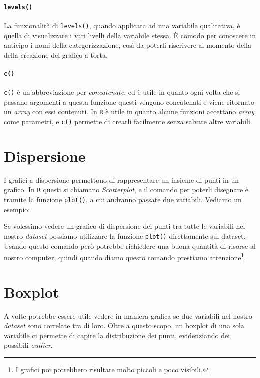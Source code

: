 \paragraph*{\texttt{levels()}} La funzionalità di \texttt{levels()}, quando
applicata ad una variabile qualitativa, è quella di visualizzare i vari livelli
della variabile stessa. È comodo per conoscere in anticipo i nomi della
categorizzazione, così da poterli riscrivere al momento della della creazione
del grafico a torta.

\paragraph*{\texttt{c()}} \texttt{c()} è un'abbreviazione per
\textit{concatenate}, ed è utile in quanto ogni volta che si passano argomenti
a questa funzione questi vengono concatenati e viene ritornato un
\textit{array} con essi contenuti. In \texttt{R} è utile in quanto alcune
funzioni accettano \textit{array} come parametri, e \texttt{c()} permette di
crearli facilmente senza salvare altre variabili.

\section{Dispersione}

I grafici a dispersione permettono di rappresentare un insieme di punti in un
grafico. In \texttt{R} questi si chiamano \textit{Scatterplot}, e il comando
per poterli disegnare è tramite la funzione \texttt{plot()}, a cui andranno
passate due variabili. Vediamo un esempio:



Se volessimo vedere un grafico di dispersione dei punti tra tutte le variabili
nel nostro \textit{dataset} possiamo utilizzare la funzione \texttt{plot()}
direttamente sul dataset. Usando questo comando però potrebbe richiedere una
buona quantità di risorse al nostro computer, quindi quando diamo questo
comando prestiamo attenzione\footnote{I grafici poi potrebbero risultare molto
piccoli e poco visibili.}.

\section{Boxplot}

A volte potrebbe essere utile vedere in maniera grafica se due variabili nel 
nostro \textit{dataset} sono correlate tra di loro. Oltre a questo scopo, un 
boxplot di una sola variabile ci permette di capire la distribuzione dei punti, 
evidenziando dei possibili \textit{outlier}.

